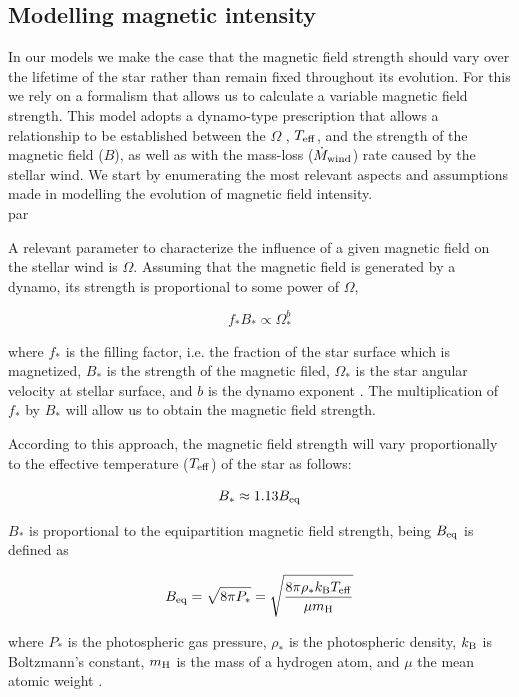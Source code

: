 \documentclass[fleqn,usenatbib]{mnras}
\begin{document}
\subsection{Modelling magnetic intensity} \label{mod_mbi}
In our models we make the case that the magnetic field strength should vary over the lifetime of the star rather than remain fixed throughout its evolution. For this we rely on a formalism \citep{Gallet2013} that allows us to calculate a variable magnetic field strength. This model adopts a dynamo-type prescription that allows a relationship to be established between the $\Omega$ , $T_{\mathrm{eff}}$, and the strength of the magnetic field ($B$), as well as with the mass-loss ($\Dot{M}_{\mathrm{wind}}$) rate caused by the stellar wind. We start by enumerating the most relevant aspects and assumptions made in modelling the evolution of magnetic field intensity. \\par 

A relevant parameter to characterize the influence of a given magnetic field on the stellar wind is $\Omega$. Assuming that the magnetic field is generated by a dynamo, its strength is proportional to some power of $\Omega$,
\begin{ceqn}
\begin{equation}
    f_*B_* \propto \Omega_*^b \label{eq:mf_strenght}
\end{equation}
\end{ceqn}
where $f_*$ is the filling factor, i.e. the fraction of the star surface which is magnetized, $B_*$ is the strength of the magnetic filed, $\Omega_*$ is the star angular velocity at stellar surface, and $b$ is the dynamo exponent \citep{Gallet2013}. The multiplication of $f_*$ by $B_*$ will allow us to obtain the magnetic field strength. \par

According to this approach, the magnetic field strength will vary proportionally to the effective temperature ($T_{\mathrm{eff}}$) of the star as follows: 
\begin{ceqn}
\begin{equation}
    B_* \approx 1.13 B_{\mathrm{eq}} \label{eq:mf_bstar}
\end{equation}
\end{ceqn}
$B_*$ is proportional to the equipartition magnetic field strength, being $B_{\mathrm{eq}}$ is defined as 
\begin{ceqn}
\begin{equation}
    B_{\mathrm{eq}} = \sqrt{8\pi P_*} = \sqrt{\frac{8\pi\rho_* k_{\mathrm{B}} T_{\mathrm{eff}}}{\mu m_{\mathrm{H}}}}\label{eq:mf_beq}    
\end{equation}
\end{ceqn}
where $P_*$ is the photospheric gas pressure, $\rho_*$ is the photospheric density, $k_{\mathrm{B}}$ is Boltzmann's constant, $m_{\mathrm{H}}$ is the mass of a hydrogen atom, and $\mu$ the mean atomic weight \citep{Cranmer2011}.
\end{document}

